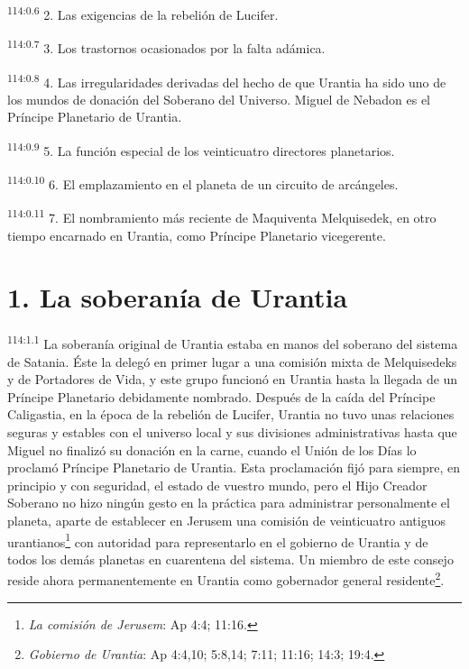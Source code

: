 \par
\textsuperscript{114:0.6} 2. Las exigencias de la rebelión de Lucifer.

\par
\textsuperscript{114:0.7} 3. Los trastornos ocasionados por la falta adámica.

\par
\textsuperscript{114:0.8} 4. Las irregularidades derivadas del hecho de que Urantia ha sido uno de los mundos de donación del Soberano del Universo. Miguel de Nebadon es el Príncipe Planetario de Urantia.

\par
\textsuperscript{114:0.9} 5. La función especial de los veinticuatro directores planetarios.

\par
\textsuperscript{114:0.10} 6. El emplazamiento en el planeta de un circuito de arcángeles.

\par
\textsuperscript{114:0.11} 7. El nombramiento más reciente de Maquiventa Melquisedek, en otro tiempo encarnado en Urantia, como Príncipe Planetario vicegerente.

\section*{1. La soberanía de Urantia}
\par
\textsuperscript{114:1.1} La soberanía original de Urantia estaba en manos del soberano del sistema de Satania. Éste la delegó en primer lugar a una comisión mixta de Melquisedeks y de Portadores de Vida, y este grupo funcionó en Urantia hasta la llegada de un Príncipe Planetario debidamente nombrado. Después de la caída del Príncipe Caligastia, en la época de la rebelión de Lucifer, Urantia no tuvo unas relaciones seguras y estables con el universo local y sus divisiones administrativas hasta que Miguel no finalizó su donación en la carne, cuando el Unión de los Días lo proclamó Príncipe Planetario de Urantia. Esta proclamación fijó para siempre, en principio y con seguridad, el estado de vuestro mundo, pero el Hijo Creador Soberano no hizo ningún gesto en la práctica para administrar personalmente el planeta, aparte de establecer en Jerusem una comisión de veinticuatro antiguos urantianos\footnote{\textit{La comisión de Jerusem}: Ap 4:4; 11:16.} con autoridad para representarlo en el gobierno de Urantia y de todos los demás planetas en cuarentena del sistema. Un miembro de este consejo reside ahora permanentemente en Urantia como gobernador general residente\footnote{\textit{Gobierno de Urantia}: Ap 4:4,10; 5:8,14; 7:11; 11:16; 14:3; 19:4.}.


